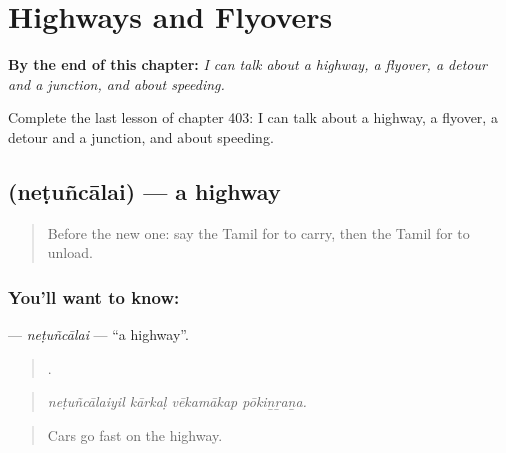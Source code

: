 
\chapter{Highways and Flyovers}
\label{ch:ta-highways-and-flyovers}

\begin{chapteropening}
\textbf{By the end of this chapter:} \emph{I can talk about a highway, a flyover, a detour and a junction, and about speeding.}

Complete the last lesson of chapter 403: I can talk about a highway, a flyover, a detour and a junction, and about speeding.
\end{chapteropening}

\section[\texorpdfstring{\ta{நெடுஞ்சாலை} (neṭuñcālai)}{நெடுஞ்சாலை (neṭuñcālai)}]{ (neṭuñcālai) — a highway}

\label{lesson:TA-C403-netuncalai}



\begin{quote}
Before the new one: say the Tamil for to carry, then the Tamil for to unload.
\end{quote}

\subsection*{You'll want to know: }
\textbf{} — \emph{neṭuñcālai} — \textquotedblleft{}a highway\textquotedblright{}.

\begin{quote}
   .
\end{quote}

\begin{quote}
\emph{neṭuñcālaiyil kārkaḷ vēkamākap pōkiṉṟaṉa.}
\end{quote}

\begin{quote}
Cars go fast on the highway.
\end{quote}


